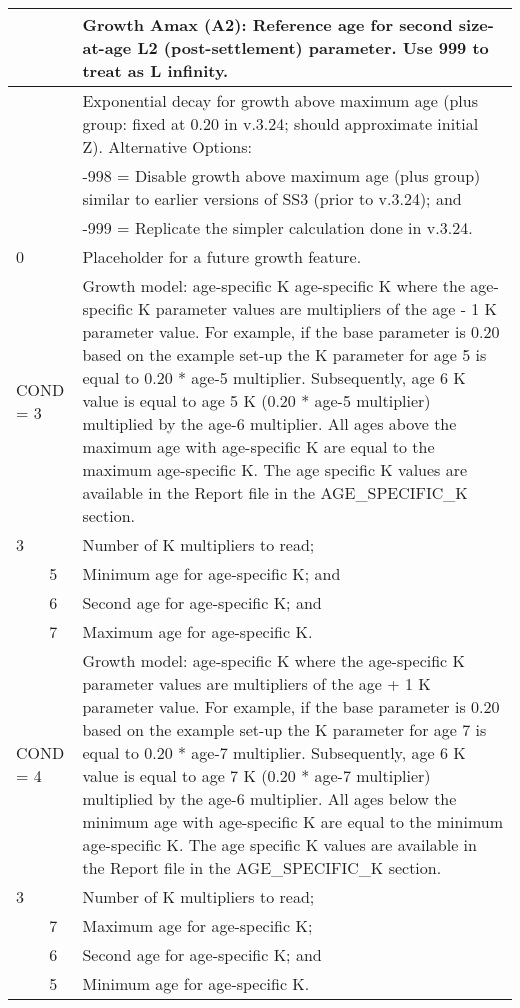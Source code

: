 \begin{longtable}{p{0.5cm} p{2cm} p{12.5cm}}
	\Tstrut 25 & & Growth Amax (A2): Reference age for second size-at-age L2 (post-settlement) parameter. Use 999 to treat as L infinity. \Bstrut\\
	\hline
	
	\Tstrut 0.20 & & Exponential decay for growth above maximum age (plus group: fixed at 0.20 in v.3.24; should approximate initial Z). Alternative Options: \\
				 & & -998 = Disable growth above maximum age (plus group) similar to earlier versions of SS3 (prior to v.3.24); and \\
				 & & -999 = Replicate the simpler calculation done in v.3.24. \Bstrut\\
	\hline
	
	0 & & Placeholder for a future growth feature. \Tstrut\Bstrut\\
	\hline

	\multicolumn{2}{l}{COND = 3} & Growth model: age-specific K age-specific K where the age-specific K parameter values are multipliers of the age - 1 K parameter value. For example, if the base parameter is 0.20 based on the example set-up the K parameter for age 5 is equal to 0.20 * age-5 multiplier. Subsequently, age 6 K value is equal to age 5 K (0.20 * age-5 multiplier) multiplied by the age-6 multiplier. All ages above the maximum age with age-specific K are equal to the maximum age-specific K. The age specific K values are available in the Report file in the AGE\_SPECIFIC\_K section. \\
	3 & & Number of K multipliers to read; \\
	& 5 & Minimum age for age-specific K; and \\
	& 6 & Second age for age-specific K; and \\
	& 7 & Maximum age for age-specific K. \Bstrut\\
	
	\multicolumn{2}{l}{COND = 4} & Growth model: age-specific K where the age-specific K parameter values are multipliers of the age + 1 K parameter value. For example, if the base parameter is 0.20 based on the example set-up the K parameter for age 7 is equal to 0.20 * age-7 multiplier. Subsequently, age 6 K value is equal to age 7 K (0.20 * age-7 multiplier) multiplied by the age-6 multiplier. All ages below the minimum age with age-specific K are equal to the minimum age-specific K. The age specific K values are available in the Report file in the AGE\_SPECIFIC\_K section. \\
	3 & & Number of K multipliers to read; \\
	  & 7 & Maximum age for age-specific K; \\
	  & 6 & Second age for age-specific K; and \\
	  & 5 & Minimum age for age-specific K. \Bstrut\\
	\hline
	

\end{longtable}
